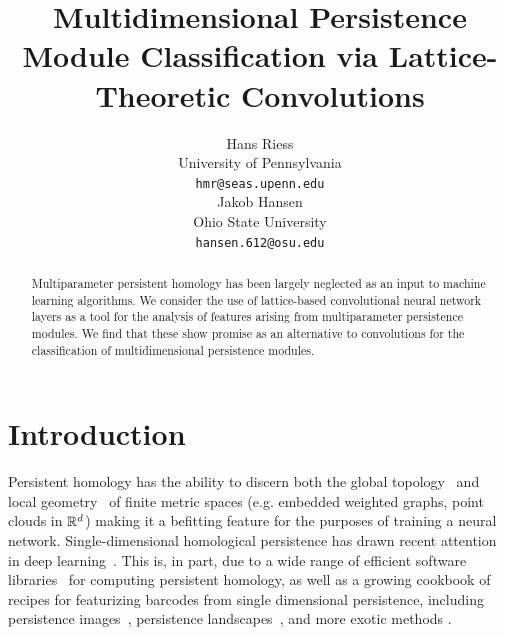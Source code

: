 \documentclass{article}
\title{Multidimensional Persistence Module Classification via Lattice-Theoretic Convolutions}
\author{%
  Hans Riess \\
  University of Pennsylvania\\
  \texttt{hmr@seas.upenn.edu} \\
  \And
  Jakob Hansen \\
  Ohio State University \\
  \texttt{hansen.612@osu.edu}
}
\begin{document}
\maketitle

\begin{abstract}
 Multiparameter persistent homology has been largely neglected as an input to
 machine learning algorithms.
 We consider the use of lattice-based convolutional neural network layers as a 
 tool for the analysis of features arising from multiparameter persistence
 modules. We find that these show promise as an alternative to convolutions for
 the classification of multidimensional persistence modules.
\end{abstract}

\section{Introduction}

Persistent homology has the ability to discern both the global
topology~\cite{ghrist_barcodes:_2008} and local
geometry~\cite{bubenik_persistent_2020} of finite metric spaces (e.g. embedded
weighted graphs, point clouds in $\mathbb{R}^d$) making it a befitting feature for the
purposes of training a neural network. Single-dimensional homological
persistence has drawn recent attention in deep learning~\cite{hofer_deep_2017,
pun_persistent-homology-based_2018, bruel-gabrielsson_topology_2020}. This is,
in part, due to a wide range of efficient software
libraries~\cite{otter_roadmap_2017, henselman_matroid_2017, bauer_ripser:_2019}
for computing persistent homology, %
as well as a growing cookbook of recipes 
for featurizing barcodes from single dimensional persistence, including
persistence images~\cite{adams_persistence_2017}, persistence
landscapes~\cite{bubenik_statistical_2015}, and more exotic methods
\cite{kalisnik_tropical_2019}.
\end{document}

